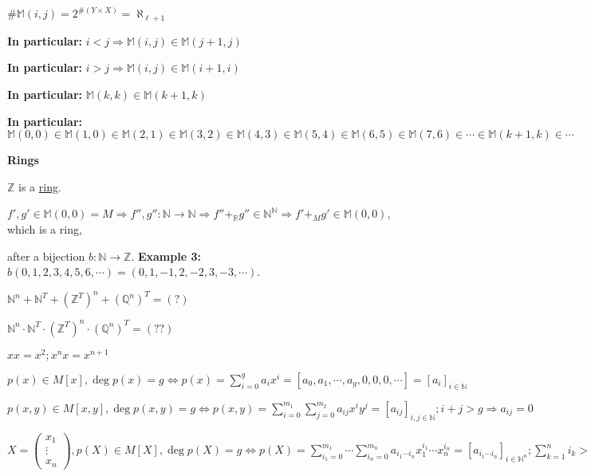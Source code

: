 \documentclass[10pt,a4paper]{article}
\begin{document}
$\# \mathbb{M}(i,j) = 2^{\# (Y \times X)} = \aleph_{\ell+1}$

\vspace{3mm}

\textbf{In particular:} $i < j \Rightarrow \mathbb{M}(i, j) \in \mathbb{M}(j + 1, j)$

\textbf{In particular:} $i > j \Rightarrow \mathbb{M}(i, j) \in \mathbb{M}(i + 1, i)$

\textbf{In particular:} $\mathbb{M}(k, k) \in \mathbb{M}(k + 1, k)$

\textbf{In particular:} $\mathbb{M}(0, 0) \in \mathbb{M}(1, 0) \in \mathbb{M}(2, 1) \in \mathbb{M}(3, 2) \in \mathbb{M}(4, 3) \in \mathbb{M}(5, 4) \in \mathbb{M}(6, 5) \in \mathbb{M}(7, 6) \in \cdots \in \mathbb{M}(k + 1, k) \in \cdots$

\vspace{3mm}

\textbf{Rings}

$\mathbb{Z}$ is a \href{https://pbs.twimg.com/media/CU7_V80WwAEvezq.png}{ring}.

$f', g' \in \mathbb{M}(0, 0) = M \Rightarrow f'', g'' : \mathbb{N} \rightarrow \mathbb{N} \Rightarrow f'' +_\mathbb{R} g'' \in \mathbb{N} ^ \mathbb{N} \Rightarrow f' +_M g' \in \mathbb{M}(0,0)$, which is a ring,

after a bijection $b : \mathbb{N} \rightarrow \mathbb{Z} $. \textbf{Example 3:} $b(0,1,2,3,4,5,6,\cdots) = (0,1,-1,2,-2,3,-3,\cdots)$.

$\mathbb{N}^n + \mathbb{N}^T + (\mathbb{Z}^T)^n + (\mathbb{Q}^n)^T = (?)$

$\mathbb{N}^n \cdot \mathbb{N}^T \cdot (\mathbb{Z}^T)^n \cdot (\mathbb{Q}^n)^T = (??)$

$xx = x^2 ; x^nx = x^{n+1}$

$p(x) \in M[x], \deg p(x) = g \Leftrightarrow p(x) = \sum\limits_{i = 0}^g a_i x^i = [a_0, a_1, \cdots, a_g, 0, 0, 0, \cdots] = [a_i]_{i \in \mathbb{N}}$

$p(x, y) \in M[x, y], \deg p(x, y) = g \Leftrightarrow p(x, y) = \sum\limits_{i = 0}^{m_1} \sum\limits_{j = 0}^{m_2} a_{ij} x^i y^j = [a_{ij}]_{i, j \in \mathbb{N}} ; i + j > g \Rightarrow a_{ij} = 0$

$X = \begin{pmatrix} x_1 \\ \vdots \\ x_n \end{pmatrix}, p(X) \in M[X], \deg p(X) = g \Leftrightarrow p(X) = \sum\limits_{i_1 = 0}^{m_1} \cdots \sum\limits_{i_n = 0}^{m_n} a_{i_1 \cdots i_n} x_1^{i_1} \cdots x_n^{i_n} = [a_{i_1 \cdots i_n}]_{i \in \mathbb{N}^n} ; \sum\limits_{k = 1}^n i_k > g \Rightarrow a_{i_1 \cdots i_n} = 0$
\end{document}
